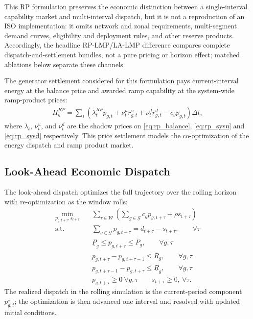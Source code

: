 \documentclass[conference]{IEEEtran}
\begin{document}
This RP formulation preserves the economic distinction between a single-interval capability market and multi-interval dispatch, but it is not a reproduction of an ISO implementation: it omits network and zonal requirements, multi-segment demand curves, eligibility and deployment rules, and other reserve products. Accordingly, the headline RP-LMP/LA-LMP difference compares complete dispatch-and-settlement bundles, not a pure pricing or horizon effect; matched ablations below separate these channels.


The generator settlement considered for this formulation pays current-interval energy at the balance price and awarded ramp capability at the system-wide ramp-product prices:
\begin{align}
\Pi_g^{RP}=\sum_t \left(\lambda_t^{RP} p_{g,t} + \nu_t^{u} r^u_{g,t} + \nu_t^{d} r^d_{g,t} - c_g p_{g,t}\right)\Delta t, \label{eq:rp_lmp}
\end{align}
where $\lambda_t$, $\nu_t^{u}$, and $\nu_t^{d}$ are the shadow prices on \eqref{eq:rp_balance}, \eqref{eq:rp_sysu} and \eqref{eq:rp_sysd} respectively. This price settlement models the co-optimization of the energy dispatch and ramp product market.

\subsection{Look-Ahead Economic Dispatch}
The look-ahead dispatch optimizes the full trajectory over the rolling horizon with re-optimization as the window rolls:
\begin{align}
\min_{p_{g,t+\tau},s_{t+\tau}} \quad
& \sum_{\tau\in\mathcal{W}}\left(\sum_{g\in\mathcal{G}} c_g p_{g,t+\tau} + \rho s_{t+\tau}\right) \label{eq:la_obj}\\
\text{s.t.}\quad
& \sum_{g\in\mathcal{G}} p_{g,t+\tau} = d_{t+\tau} - s_{t+\tau}, \qquad \forall \tau \label{eq:la_balance}\\
& \underline P_g \le p_{g,t+\tau} \le \overline P_g, \qquad \forall g,\tau \label{eq:la_cap}\\
& p_{g,t+\tau} - p_{g,t+\tau-1} \le \overline R_g, \qquad \forall g,\tau \label{eq:la_ru}\\
& p_{g,t+\tau-1} - p_{g,t+\tau} \le \underline R_g, \qquad \forall g,\tau \label{eq:la_rd}\\
& p_{g,t+\tau} \geq 0 \ \forall g, \tau\qquad s_{t+\tau} \ge 0, \  \forall \tau. \label{eq:la_shed}
\end{align}
The realized dispatch in the rolling simulation is the current-period component $p_{g,t}^{\star}$; the optimization is then advanced one interval and resolved with updated initial conditions.
\end{document}
